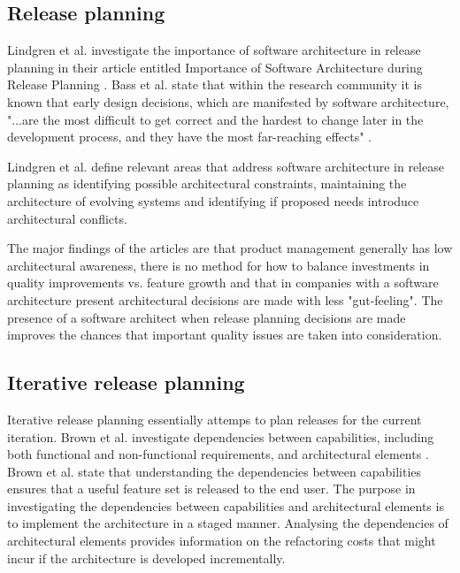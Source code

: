\documentclass[conference]{IEEEtran}
\begin{document}
\subsection{Release planning}

Lindgren et al. investigate the importance of software architecture in release planning in their article entitled Importance of Software Architecture during Release Planning \cite{lindgren2008importance}. Bass et al. state that within the research community it is known that early design decisions, which are manifested by software architecture, "...are the most difficult to get correct and the hardest to change later in the development process, and they have the most far-reaching effects" \cite{bass2003software}.

Lindgren et al. define relevant areas that address software architecture in release planning as identifying possible architectural constraints, maintaining the architecture of evolving systems and identifying if proposed needs introduce architectural conflicts. 

The major findings of the articles are that product management generally has low architectural awareness, there is no method for how to balance investments in quality improvements vs. feature growth and that in companies with a software architecture present architectural decisions are made with less "gut-feeling". The presence of a software architect when release planning decisions are made improves the chances that important quality issues are taken into consideration.

\subsection{Iterative release planning}

Iterative release planning essentially attemps to plan releases for the current iteration. Brown et al. investigate dependencies between capabilities, including both functional and non-functional requirements, and architectural elements \cite{brown2011analysis}. Brown et al. state that understanding the dependencies between capabilities ensures that a useful feature set is released to the end user. The purpose in investigating the dependencies between capabilities and architectural elements is to implement the architecture in a staged manner. Analysing the dependencies of architectural elements provides information on the refactoring costs that might incur if the architecture is developed incrementally.
\end{document}
